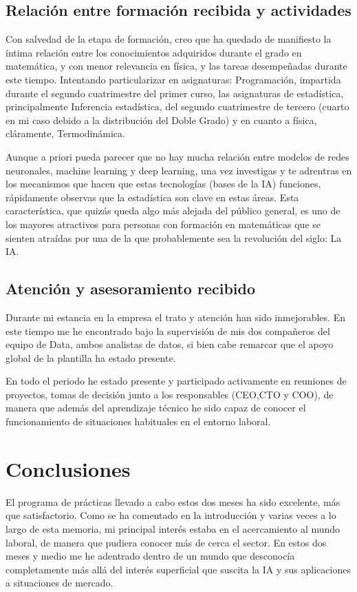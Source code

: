 \section{Relación entre formación recibida y actividades}
\label{Relacion entre formacion recibida y actividades}
%
%
Con salvedad de la etapa de formación, creo que ha quedado de manifiesto la íntima relación entre los conocimientos adquiridos durante el grado en matemática, y con menor relevancia en física, y las tareas desempeñadas durante este tiempo. Intentando particularizar en asignaturas: Programación, impartida durante el segundo cuatrimestre del primer curso, las asignaturas de estadística, principalmente Inferencia estadística, del segundo cuatrimestre de tercero (cuarto en mi caso debido a la distribución del Doble Grado) y en cuanto a física, cláramente, Termodinámica.

Aunque a priori pueda parecer que no hay mucha relación entre modelos de redes neuronales, machine learning y deep learning, una vez investigas y te adrentras en los mecanismos que hacen que estas tecnologías (bases de la IA) funciones, rápidamente observas que la estadística son clave en estas áreas. Esta característica, que quizás queda algo más alejada del público general, es uno de los mayores atractivos para personas con formación en matemáticas que se sienten atraídas por una de la que probablemente sea la revolución del siglo: La IA.
%
%
\section{Atención y asesoramiento recibido} \label{Atencion y asesoramiento recibido}
%
%
Durante mi estancia en la empresa el trato y atención han sido inmejorables. En este tiempo me he encontrado bajo la supervisión de mis dos compañeros del equipo de Data, ambos analistas de datos, si bien cabe remarcar que el apoyo global de la plantilla ha estado presente.

En todo el periodo he estado presente y participado activamente en reuniones de proyectos, tomas de decisión junto a los responsables (CEO,CTO y COO), de manera que además del aprendizaje técnico he sido capaz de conocer el funcionamiento de situaciones habituales en el entorno laboral.
%
%
\chapter{Conclusiones}
%
%
El programa de prácticas llevado a cabo estos dos meses ha sido excelente, más que satisfactorio. Como se ha comentado en la introducción y varias veces a lo largo de esta memoria, mi principal interés estaba en el acercamiento al mundo laboral, de manera que pudiera conocer más de cerca el sector. En estos dos meses y medio me he adentrado dentro de un mundo que desconocía completamente más allá del interés superficial que suscita la IA y sus aplicaciones a situaciones de mercado.


